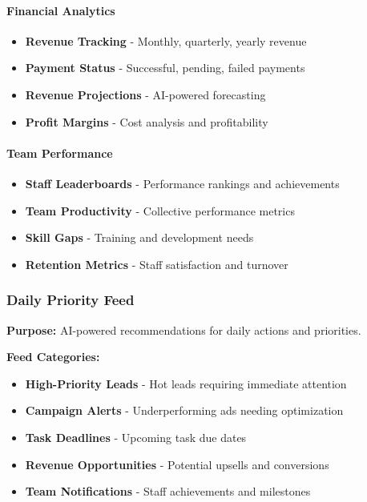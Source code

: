 \documentclass[12pt,a4paper]{article}
\begin{document}
\paragraph{Financial Analytics}
\begin{itemize}
    \item \textbf{Revenue Tracking} - Monthly, quarterly, yearly revenue
    \item \textbf{Payment Status} - Successful, pending, failed payments
    \item \textbf{Revenue Projections} - AI-powered forecasting
    \item \textbf{Profit Margins} - Cost analysis and profitability
\end{itemize}

\paragraph{Team Performance}
\begin{itemize}
    \item \textbf{Staff Leaderboards} - Performance rankings and achievements
    \item \textbf{Team Productivity} - Collective performance metrics
    \item \textbf{Skill Gaps} - Training and development needs
    \item \textbf{Retention Metrics} - Staff satisfaction and turnover
\end{itemize}

\subsubsection{Daily Priority Feed}
\textbf{Purpose:} AI-powered recommendations for daily actions and priorities.

\textbf{Feed Categories:}
\begin{itemize}
    \item \textbf{High-Priority Leads} - Hot leads requiring immediate attention
    \item \textbf{Campaign Alerts} - Underperforming ads needing optimization
    \item \textbf{Task Deadlines} - Upcoming task due dates
    \item \textbf{Revenue Opportunities} - Potential upsells and conversions
    \item \textbf{Team Notifications} - Staff achievements and milestones
\end{itemize}
\end{document}
